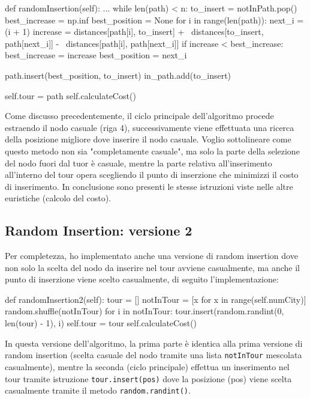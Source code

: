 \documentclass[a4paper,12pt]{report}
\begin{document}
\begin{python}
def randomInsertion(self):
  ...
  while len(path) < n:
    to_insert = notInPath.pop()
    best_increase = np.inf
    best_position = None
    for i in range(len(path)):
      next_i = (i + 1) %
      increase = distances[path[i], to_insert] + \
                 distances[to_insert, path[next_i]] - \
                 distances[path[i], path[next_i]]
      if increase < best_increase:
        best_increase = increase
        best_position = next_i

    path.insert(best_position, to_insert)
    in_path.add(to_insert)

  self.tour = path
  self.calculateCost()
\end{python}
Come discusso precedentemente, il ciclo principale dell'algoritmo procede estraendo il nodo casuale (riga 4), successivamente viene effettuata una ricerca della posizione migliore dove inserire il nodo casuale. Voglio sottolineare come questo metodo non sia "completamente casuale", ma solo la parte della selezione del nodo fuori dal tuor è casuale, mentre la parte relativa all'inserimento all'interno del tour opera scegliendo il punto di inserzione che minimizzi il costo di inserimento. \newline
In conclusione sono presenti le stesse istruzioni viste nelle altre euristiche (calcolo del costo).

\subsection{Random Insertion: versione 2}
Per completezza, ho implementato anche una versione di random insertion dove non solo la scelta del nodo da inserire nel tour avviene casualmente, ma anche il punto di inserzione viene scelto casualmente, di seguito l'implementazione:
\begin{python}
def randomInsertion2(self):
    tour = []
    notInTour = [x for x in range(self.numCity)]
    random.shuffle(notInTour)
    for i in notInTour:
      tour.insert(random.randint(0, len(tour) - 1), i)
    self.tour = tour
    self.calculateCost()
\end{python}
In questa versione dell'algoritmo, la prima parte è identica alla prima versione di random insertion (scelta casuale del nodo tramite una lista \lstinline!notInTour! mescolata casualmente), mentre la seconda (ciclo principale) effettua un inserimento nel tour tramite istruzione \lstinline|tour.insert(pos)| dove la posizione (pos) viene scelta casualmente tramite il metodo \lstinline|random.randint()|.
\end{document}
